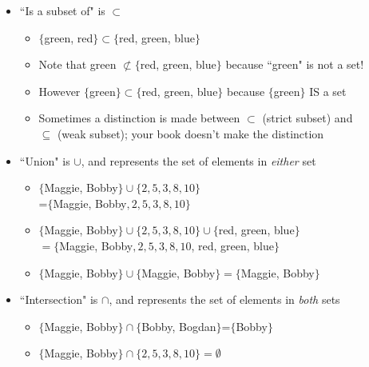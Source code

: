 \documentclass[10pt]{seminar}
\begin{document}
\begin{slide}
\begin{itemize}
 \item ``Is a subset of" is $\subset$
 
  \begin{itemize}
 \item $\{$green, red$\} \subset \{$red, green, blue$\}$
  \item Note that green $\not\subset \{$red, green, blue$\}$ because ``green" is not a set!
    \item However $\{$green$\}\subset \{$red, green, blue$\}$ because $\{$green$\}$ IS a set
    \item Sometimes a distinction is made between $\subset$ (strict subset) and \\ $\subseteq$ (weak subset); your book doesn't make the distinction
   \end{itemize}
 
\newslide

\item ``Union" is $\cup$, and represents the set of elements in \textit{either} set
\vspace{.25in}
\begin{itemize}

\item $\{$Maggie, Bobby$\} \cup \{2, 5, 3, 8, 10\}$ \\ =$\{$Maggie, Bobby$, 2, 5, 3, 8, 10\}$
\vspace{.15in}
\item $\{$Maggie, Bobby$\} \cup \{2, 5, 3, 8, 10\} \cup \{$red, green, blue$\}$ \\ $=\{$Maggie, Bobby$, 2, 5, 3, 8, 10$, red, green, blue$\}$
\vspace{.15in}
\item $\{$Maggie, Bobby$\} \cup \{$Maggie, Bobby$\} =\{$Maggie, Bobby$\}$
\end{itemize}

\newslide

\item ``Intersection" is $\cap$, and represents the set of elements in \textit{both} sets
\vspace{.25in}
\begin{itemize}

\item $\{$Maggie, Bobby$\} \cap \{$Bobby, Bogdan$\}$=$\{$Bobby$\}$

\item $\{$Maggie, Bobby$\} \cap \{2, 5, 3, 8, 10\}=\emptyset$

\end{itemize}


\end{itemize}
\end{slide}
\end{document}
